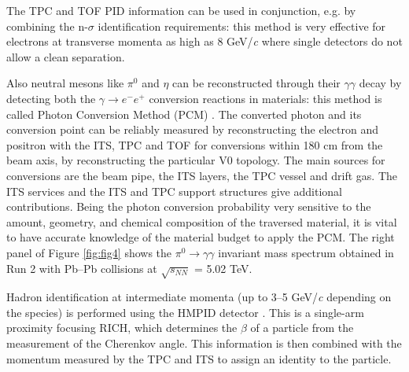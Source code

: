 \documentclass[10pt]{article}
\begin{document}
The TPC and TOF PID information can be used in conjunction, e.g. by combining the n-$\sigma$ identification requirements: this method is very effective for electrons at transverse momenta as high as 8 GeV/{\it c} where single detectors do not allow a clean separation.

Also neutral mesons like $\pi^{0}$ and $\eta$ can be reconstructed through their $\gamma \gamma$ decay by detecting both the $\gamma \rightarrow e^{-}e^{+}$ conversion reactions in materials: this method is called Photon Conversion Method (PCM) \cite{ref:perf}. 
The converted photon and its conversion point can be reliably measured by reconstructing the electron and positron with the ITS, TPC and TOF for conversions within 180 cm from the beam axis, by reconstructing the particular V0 topology. The main sources for conversions are the beam pipe, the ITS layers, the TPC vessel and drift gas. The ITS services and the ITS and TPC support structures give additional contributions. Being the photon conversion probability very sensitive to the amount, geometry, and chemical composition of the traversed material, it is vital to have accurate knowledge of the material budget to apply the PCM. The right panel of Figure \ref{fig:fig4} shows the  $\pi^{0} \rightarrow \gamma \gamma$ invariant mass spectrum obtained in Run 2 with Pb--Pb collisions at $\sqrt{s_{NN}}$ = 5.02 TeV.
 
Hadron identification at intermediate momenta (up to 3--5 GeV/{\it c} depending on the species) is performed using the HMPID detector \cite{ref:perf}. This is a single-arm proximity focusing RICH, which determines the $\beta$ of a particle from the measurement of the Cherenkov angle. This information is then combined with the momentum measured by the TPC and ITS to assign an identity to the particle.
\end{document}
